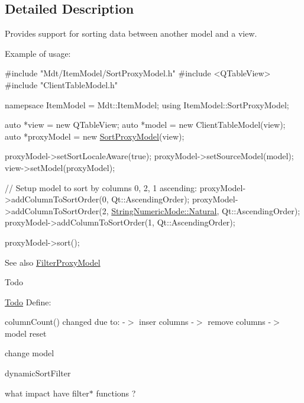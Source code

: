 \subsection{Detailed Description}
Provides support for sorting data between another model and a view. 

Example of usage\+: 
\begin{DoxyCode}
\textcolor{preprocessor}{#include "Mdt/ItemModel/SortProxyModel.h"}
\textcolor{preprocessor}{#include <QTableView>}
\textcolor{preprocessor}{#include "ClientTableModel.h"}

namepsace ItemModel = Mdt::ItemModel;
\textcolor{keyword}{using} ItemModel::SortProxyModel;

\textcolor{keyword}{auto} *view = \textcolor{keyword}{new} QTableView;
\textcolor{keyword}{auto} *model = \textcolor{keyword}{new} ClientTableModel(view);
\textcolor{keyword}{auto} *proxyModel = \textcolor{keyword}{new} \hyperlink{class_mdt_1_1_item_model_1_1_sort_proxy_model_a1764706e28e183e83b51b0e349b33bff}{SortProxyModel}(view);

proxyModel->setSortLocaleAware(\textcolor{keyword}{true});
proxyModel->setSourceModel(model);
view->setModel(proxyModel);

\textcolor{comment}{// Setup model to sort by columns 0, 2, 1 ascending:}
proxyModel->addColumnToSortOrder(0, Qt::AscendingOrder);
proxyModel->addColumnToSortOrder(2, \hyperlink{namespace_mdt_1_1_item_model_a88210a5defc335e5beaed03043620b25a2bd8ab451a35759c5737128e35c8011a}{StringNumericMode::Natural}, 
      Qt::AscendingOrder);
proxyModel->addColumnToSortOrder(1, Qt::AscendingOrder);

proxyModel->sort();
\end{DoxyCode}


\begin{DoxySeeAlso}{See also}
\hyperlink{class_mdt_1_1_item_model_1_1_filter_proxy_model}{Filter\+Proxy\+Model}
\end{DoxySeeAlso}
\begin{DoxyRefDesc}{Todo}
\item[\hyperlink{todo__todo000009}{Todo}]Define\+:
\begin{DoxyItemize}
\item column\+Count() changed due to\+: -\/$>$ inser columns -\/$>$ remove columns -\/$>$ model reset
\item change model
\item dynamic\+Sort\+Filter
\item what impact have filter$\ast$ functions ? 
\end{DoxyItemize}\end{DoxyRefDesc}


